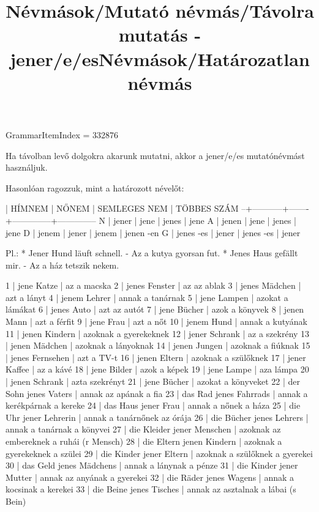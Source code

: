 \title{Névmások/Mutató névmás/Távolra mutatás - jener/e/es}

GrammarItemIndex = 332876

\begin{desc}
Ha távolban levő dolgokra akarunk mutatni, akkor a jener/e/es mutatónévmást használjuk.

Hasonlóan ragozzuk, mint a határozott névelőt:

  | HÍMNEM    | NŐNEM | SEMLEGES NEM | TÖBBES SZÁM
--+-----------+-------+--------------+--------------
N | jener     | jene  | jenes        | jene
A | jenen     | jene  | jenes        | jene
D | jenem     | jener | jenem        | jenen -en
G | jenes -es | jener | jenes -es    | jener

Pl.: * Jener Hund läuft schnell. - Az a kutya gyorsan fut.
* Jenes Haus gefällt mir. - Az a ház tetszik nekem.
\end{desc}

\begin{exmp}
1 | jene Katze | az a macska
2 | jenes Fenster | az az ablak
3 | jenes Mädchen | azt a lányt
4 | jenem Lehrer | annak a tanárnak
5 | jene Lampen | azokat a lámákat
6 | jenes Auto | azt az autót
7 | jene Bücher | azok a könyvek
8 | jenen Mann | azt a férfit
9 | jene Frau | azt a nőt
10 | jenem Hund | annak a kutyának
11 | jenen Kindern | azoknak a gyerekeknek
12 | jener Schrank | az a szekrény
13 | jenen Mädchen | azoknak a lányoknak
14 | jenen Jungen | azoknak  a fiúknak
15 | jenes Fernsehen | azt a TV-t
16 | jenen Eltern | azoknak a szülőknek
17 | jener Kaffee | az a kávé
18 | jene Bilder | azok a képek
19 | jene Lampe | aza lámpa
20 | jenen Schrank | azta szekrényt
21 | jene Bücher | azokat a könyveket
22 | der Sohn jenes Vaters | annak az apának a fia
23 | das Rad jenes Fahrrads | annak a kerékpárnak a kereke
24 | das Haus jener Frau | annak a nőnek a háza
25 | die Uhr jener Lehrerin | annak a tanárnőnek az órája
26 | die Bücher jenes Lehrers | annak a tanárnak a könyvei
27 | die Kleider jener Menschen | azoknak az embereknek a ruhái (r Mensch)
28 | die Eltern jenen Kindern | azoknak a gyerekeknek a szülei
29 | die Kinder jener Eltern | azoknak a szülőknek a gyerekei
30 | das Geld jenes Mädchens | annak a lánynak a pénze
31 | die Kinder jener Mutter | annak az anyának a gyerekei
32 | die Räder jenes Wagens | annak a kocsinak a kerekei
33 | die Beine jenes Tisches | annak az asztalnak a lábai (s Bein)
\end{exmp}

\title{Névmások/Határozatlan névmás}

